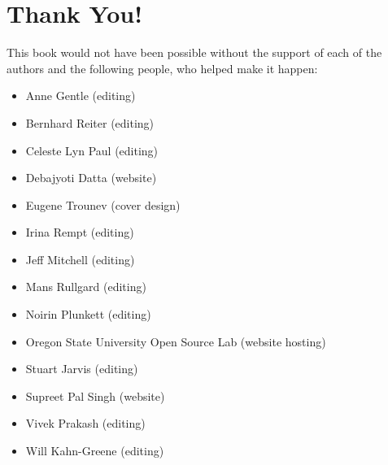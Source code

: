 \section*{Thank You!}

This book would not have been possible without the support of each of the
authors and the following people, who helped make it happen:
\begin{itemize}
 \item Anne Gentle (editing)
 \item Bernhard Reiter (editing)
 \item Celeste Lyn Paul (editing)
 \item Debajyoti Datta (website)
 \item Eugene Trounev (cover design)
 \item Irina Rempt (editing)
 \item Jeff Mitchell (editing)
 \item Mans Rullgard (editing)
 \item Noirin Plunkett (editing)
 \item Oregon State University Open Source Lab (website hosting)
 \item Stuart Jarvis (editing)
 \item Supreet Pal Singh (website)
 \item Vivek Prakash (editing)
 \item Will Kahn-Greene (editing)
\end{itemize}

\newpage